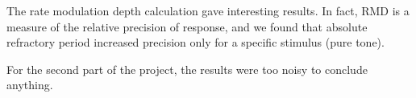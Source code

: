 The rate modulation depth calculation gave interesting results. 
In fact, RMD is a measure of the relative precision of response,
and we found that absolute refractory period increased precision only 
for a specific stimulus (pure tone). %

For the second part of the project, the results were too noisy to conclude anything.